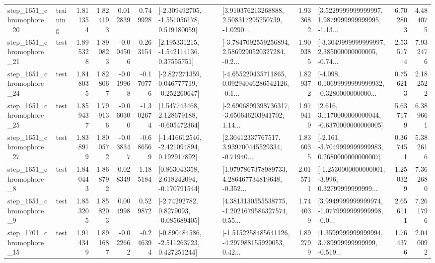 \begin{tabular}{llrrrrllrlrr}
 step\_1651\_chromophore\_20 &  training &      1.811354 &    1.824193 &      0.012839 &  0.749928 &   [-2.309492705, -1.551056178, 0.519180059] &  [3.910376213268888, 2.508317295250739, -1.0290... &       1.933682 &  [3.5229999999999997, 1.9879999999999995, -1.13... &            6.702803 &          4.484075 \\
 step\_1651\_chromophore\_21 &      test &      1.895328 &    1.890823 &     -0.004506 &  0.263154 &     [2.195331215, -1.542114136, 0.37555751] &  [-3.7847092559256894, 2.5869290520327284, -0.2... &       1.909385 &  [-3.3049999999999997, 2.385000000000005, -0.74... &            2.535174 &          7.932476 \\
 step\_1651\_chromophore\_24 &      test &      1.848035 &    1.828067 &     -0.019968 & -0.170776 &   [-2.827271359, 0.046777719, -0.252260647] &  [-4.655220435711865, 0.09294046286542126, -0.1... &       1.829372 &  [-4.098, 0.10699999999999932, -0.3280000000000... &            0.756213 &          2.182522 \\
 step\_1651\_chromophore\_25 &      test &      1.859437 &    1.799136 &     -0.060300 & -1.302674 &    [1.547743468, 2.128679188, -0.605472364] &  [-2.6906899398736317, -3.650646203941702, 1.14... &       1.979419 &   [2.616, 3.1170000000000044, -0.6370000000000005] &            5.637179 &          6.389661 \\
 step\_1651\_chromophore\_27 &      test &      1.838919 &    1.800572 &     -0.038347 & -0.686569 &   [-1.416612546, -2.421094894, 0.192917892] &  [2.30412337767517, 3.939700445529334, -0.71940... &       1.836035 &  [-2.161, -3.7049999999999983, 0.2680000000000007] &            0.367451 &          5.382616 \\
  step\_1651\_chromophore\_8 &      test &      1.840443 &    1.868792 &      0.028349 &  1.185184 &    [0.863043358, 2.618242094, -0.170791544] &  [1.9797867378989733, 4.286467734819648, -0.352... &       2.015711 &  [-1.2530000000000001, -3.996, 0.32799999999999... &            1.250329 &          7.362680 \\
  step\_1651\_chromophore\_9 &      test &      1.853205 &    1.858203 &      0.004998 &  0.529872 &      [-2.74292782, 0.8279093, -0.085689405] &  [4.3813130555538775, -1.2021679586327574, 0.55... &       1.744039 &  [3.9949999999999974, -1.0779999999999998, -0.0... &            2.656111 &          7.261796 \\
 step\_1701\_chromophore\_15 &      test &      1.914349 &    1.891687 &     -0.022662 & -0.246394 &   [-0.890484586, -2.511263723, 0.427251244] &  [-1.5152258485641126, -4.297988155920053, 0.42... &       1.892799 &  [1.3599999999999994, 3.789999999999999, -0.519... &            1.764376 &          2.040092 \\

\end{tabular}
